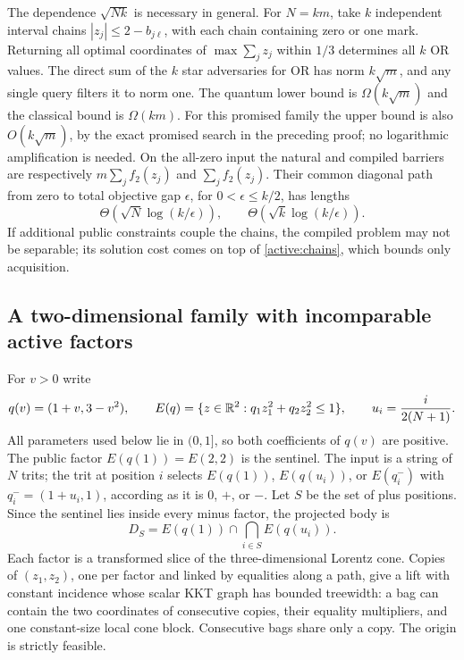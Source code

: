 The dependence $\sqrt{Nk}$ is necessary in general. For $N=km$,
take $k$ independent interval chains $|z_j|\leq2-b_{j\ell}$,
with each chain containing zero or one mark. Returning all optimal
coordinates of $\max\sum_jz_j$ within $1/3$ determines all $k$ OR
values. The direct sum of the $k$ star adversaries for OR has norm
$k\sqrt m$, and any single query filters it to norm one. The quantum lower bound
is $\Omega(k\sqrt m)$ and the classical bound is $\Omega(km)$.
For this promised family the upper bound is also
$O(k\sqrt m)$, by the exact promised search in the preceding proof;
no logarithmic amplification is needed. On the all-zero input the
natural and compiled barriers are respectively
$m\sum_j f_2(z_j)$ and $\sum_j f_2(z_j)$.
Their common diagonal path from zero to total objective gap
$\epsilon$, for $0<\epsilon\leq k/2$, has lengths
\[
 \Theta\!\left(\sqrt N\log(k/\epsilon)\right),\qquad
 \Theta\!\left(\sqrt k\log(k/\epsilon)\right).
\]
If additional public constraints couple the chains, the compiled
problem may not be separable; its solution cost comes on top of
\eqref{active:chains}, which bounds only acquisition.

\subsection{A two-dimensional family with incomparable active factors}

For $v>0$ write
\[
 q(v)=(1+v,3-v^2),\qquad
 E(q)=\{z\in\mathbb R^2:q_1z_1^2+q_2z_2^2\leq1\},\qquad
 u_i=\frac{i}{2(N+1)}.
\]
All parameters used below lie in $(0,1]$, so both coefficients
of $q(v)$ are positive. The public factor $E(q(1))=E(2,2)$ is the
sentinel. The input is a string of $N$ trits; the trit at position $i$
selects $E(q(1))$, $E(q(u_i))$, or $E(q_i^-)$ with $q_i^-=(1+u_i,1)$,
according as it is $0$, $+$, or $-$. Let $S$ be the set of plus
positions. Since the sentinel lies inside every minus factor, the
projected body is
\begin{equation}\label{active:pareto-body}
 D_S=E(q(1))\cap\bigcap_{i\in S}E(q(u_i)).
\end{equation}
Each factor is a transformed slice of the three-dimensional Lorentz
cone. Copies of $(z_1,z_2)$, one per factor and linked by equalities
along a path, give a lift with constant incidence whose scalar KKT
graph has bounded treewidth: a bag can contain the
two coordinates of consecutive copies, their equality multipliers,
and one constant-size local cone block. Consecutive bags share
only a copy. The origin is strictly feasible.

